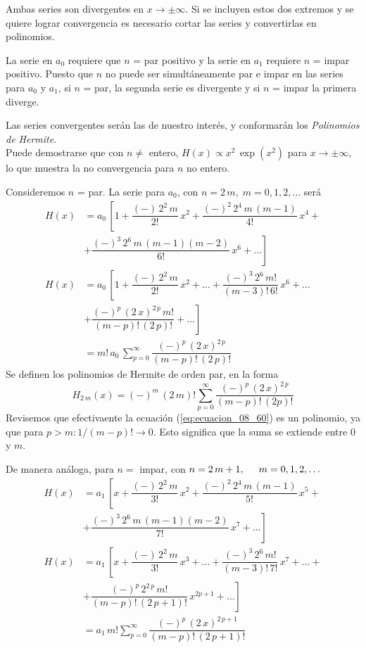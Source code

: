 Ambas series son divergentes en $x \to \pm \infty$. Si se incluyen estos dos extremos y se quiere lograr convergencia es necesario cortar las series y convertirlas en polinomios.
\par
La serie en $a_{0}$ requiere que $n$ = par positivo y la serie en $a_{1}$ requiere $n$ = impar positivo. Puesto que $n$ no puede ser simultáneamente par e impar en las series para $a_{0}$ y $a_{1}$, si $n$ = par, la segunda serie es divergente y si $n$ = impar la primera diverge.
\par
Las series convergentes serán las de nuestro interés, y conformarán los \emph{Polinomios de Hermite}.
\\
Puede demostrarse que con $n \neq$ entero, $H(x) \propto x^{2} \, \exp(x^{2})$ para $x \to \pm \infty$, lo que muestra la no convergencia para $n$ no entero.
\par
Consideremos $n$ = par. La serie para $a_{0}$, con $n=2\, m, \; m = 0, 1, 2, \ldots$ será
\begin{align*}
H(x) &= a_{0} \, \left[ 1 + \dfrac{(-) \, 2^{2} \, m}{2!} \, x^{2} + \dfrac{(-)^{2} \, 2^{4} \, m \, (m - 1)}{4!} \, x^{4} + \right. \\
&+ \left. \dfrac{(-)^{3} \, 2^{6} \, m \, (m-1)(m-2)}{6!} \, x^{6} + \ldots \right] \\[1em]
H(x) &= a_{0}\, \left[ 1 + \dfrac{(-)\, 2^{2}\, m}{2!} \, x^{2} + \ldots + \dfrac{(-)^{3} \, 2^{6}\, m!}{(m-3)! \, 6!} \, x^{6} + \ldots \right. \\[0.5em]
&+ \left. \dfrac{(-)^{p} \, (2 \, x)^{2\, p}\, m!}{(m-p)! \, (2\, p)!} + \ldots \right] \\[0.5em]
&= m!\, a_{0} \, \sum_{p=0}^{\infty} \dfrac{(-)^{p}\, (2\, x)^{2\, p}}{(m-p)! \, (2\, p)!}
\end{align*}
Se definen los polinomios de Hermite de orden par, en la forma
\begin{equation}
H_{2\, m} (x) = (-)^{m} \, (2\, m)! \sum_{p=0}^{\infty} \dfrac{(-)^{p} \, (2\, x)^{2\, p}}{(m-p)!\, (2p)!}
\label{eq:ecuacion_08_60}
\end{equation}
Revisemos que efectivaente la ecuación (\ref{eq:ecuacion_08_60}) es un polinomio, ya que para $p > m : 1 / (m-p)! \to 0$. Esto significa que la suma se extiende entre $0$ y $m$.
\par
De manera análoga, para $n=$ impar, con $n = 2 \, m + 1, \hspace{0.5cm} m=0, 1, 2, \ldots$
\begin{align*}
H(x) & = a_{1} \, \left[ x + \dfrac{(-) \, 2^{2} \, m}{3!} \, x^{2} + \dfrac{(-)^{2} \, 2^{4} \, m \, (m - 1)}{5!} \, x^{5} + \right. \\
& + \left. \dfrac{(-)^{3} \, 2^{6} \, m \, (m-1)(m-2)}{7!} \, x^{7} + \ldots \right] \\[1em]
H(x) & = a_{1}\, \left[ x + \dfrac{(-)\, 2^{2}\, m}{3!} \, x^{3} + \ldots + \dfrac{(-)^{3} \, 2^{6}\, m!}{(m-3)! \, 7!} \, x^{7} + \ldots + \right. \\[0.5em]
&+  \left. \dfrac{(-)^{p} \, 2^{2 \, p} \, m!}{(m-p)! \, (2\, p + 1)!} \, x^{2p+1} + \ldots \right] \\[0.5em]
& = a_{1} \, m! \sum_{p=0}^{\infty} \dfrac{(-)^{p}\, (2\, x)^{2\, p+1}}{(m-p)! \, (2\, p + 1)!}  
\end{align*}
